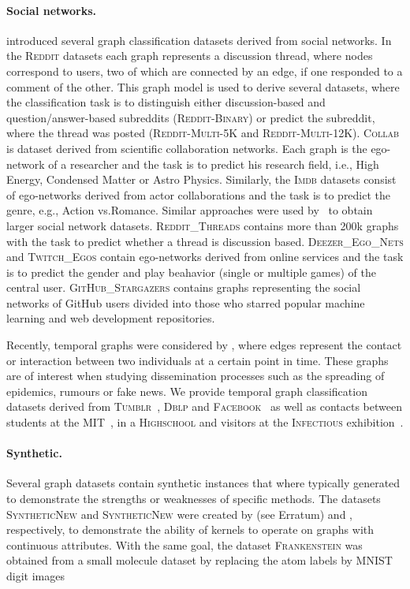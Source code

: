 \documentclass{article}
\theoremstyle{definition}
\begin{document}
\paragraph{Social networks.}
\citet{Yan+2015a} introduced several graph classification datasets derived from social networks. In the \textsc{Reddit} datasets each graph represents a discussion thread, where nodes correspond to users, two of which are connected by an edge, if one responded to a comment of the other. This graph model is used to derive several datasets, where the classification task is to distinguish either discussion-based and question/answer-based subreddits (\textsc{Reddit-Binary}) or predict the subreddit, where the thread was posted (\textsc{Reddit-Multi-5K} and \textsc{Reddit-Multi-12K}). \textsc{Collab} is dataset derived from scientific collaboration networks. Each graph is the ego-network of a researcher and the task is to predict his research field, i.e., High Energy, Condensed Matter or Astro Physics. Similarly, the \textsc{Imdb} datasets consist of ego-networks derived from actor collaborations and the task is to predict the genre, e.g.,  Action vs.\@ Romance.
Similar approaches were used by~\citet{Rozemberczki2020} to obtain larger social network datasets. \textsc{Reddit\_Threads} contains more than 200k graphs with the task to predict whether a thread is discussion based. \textsc{Deezer\_Ego\_Nets} and \textsc{Twitch\_Egos} contain ego-networks derived from online services and the task is to predict the gender and play beahavior (single or multiple games) of the central user.
\textsc{GitHub\_Stargazers} contains graphs representing the social networks of GitHub users divided into those who starred popular machine learning and web development repositories.


Recently, temporal graphs were considered by \citet{Oettershagen2019}, where edges represent the contact or interaction between two individuals at a certain point in time. These graphs are of interest when studying dissemination processes such as the spreading of epidemics, rumours or fake news. We provide temporal graph classification datasets derived from \textsc{Tumblr}~\citep{rozenshtein2016reconstructing}, \textsc{Dblp} and \textsc{Facebook}~\citep{viswanath2009evolution} as well as contacts between students at the \textsc{MIT}~\cite{konect:eagle06}, in a \textsc{Highschool} and visitors at the \textsc{Infectious} exhibition~\citep{Isella2011}.

\paragraph{Synthetic.}
Several graph datasets contain synthetic instances that where typically generated to demonstrate the strengths or weaknesses of specific methods. The datasets \textsc{SyntheticNew} and \textsc{SyntheticNew} were created by \citet{Fer+2013} (see Erratum) and \citet{Mor+2016}, respectively, to demonstrate the ability of kernels to operate on graphs with continuous attributes.
With the same goal, the dataset \textsc{Frankenstein} was obtained from a small molecule dataset by replacing the atom labels by MNIST digit images~\citep{Ors+2015}
\end{document}
